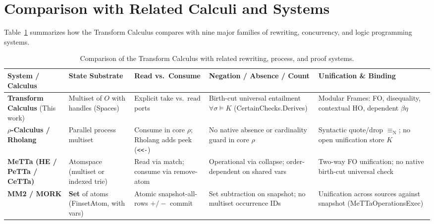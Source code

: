 \documentclass[11pt,a4paper]{article}
\theoremstyle{definition}
\DeclareRobustCommand{\lean}[1]{%
  \ifmmode\text{\normalfont\ttfamily\footnotesize\detokenize{#1}}%
  \else{\normalfont\footnotesize\leanurl{#1}}\fi}
\DeclareRobustCommand{\metta}[1]{\text{\normalfont\ttfamily\footnotesize #1}}
\def\lean#1{#1}%
\def\metta#1{#1}%
\begin{document}
\section{Comparison with Related Calculi and Systems}
\label{sec:related}

Table~\ref{tab:comparison} summarizes how the Transform Calculus compares with nine major families of rewriting, concurrency, and logic programming systems.

\begin{table}[t]
\centering
\caption{Comparison of the Transform Calculus with related rewriting, process, and proof systems.}
\label{tab:comparison}
\footnotesize
\setlength{\tabcolsep}{3.5pt}
\renewcommand{\arraystretch}{1.18}
\begin{tabular}{@{}>{\raggedright\arraybackslash}p{2.6cm}>{\raggedright\arraybackslash}p{2.3cm}>{\raggedright\arraybackslash}p{2.6cm}>{\raggedright\arraybackslash}p{3.6cm}>{\raggedright\arraybackslash}p{3.6cm}@{}}
\toprule
\textbf{System / Calculus} & \textbf{State Substrate} & \textbf{Read vs.\ Consume} & \textbf{Negation / Absence / Count} & \textbf{Unification \& Binding} \\
\midrule
\textbf{Transform Calculus} \newline (This work) & Multiset of $O$ with handles (\lean{Spaces}) & Explicit $\mathrm{take}$ vs.\ $\mathrm{read}$ ports & Birth-cut universal entailment $\forall \sigma \models K$ (\lean{CertainChecks.Derives}) & Modular \lean{Frames}: FO, disequality, contextual HO, dependent $\beta\eta$ \\
\textbf{$\rho$-Calculus / Rholang} \newline \cite{MeredithRadestock2005Rho} & Parallel process multiset & Consume in core $\rho$; Rholang adds \metta{peek} (\texttt{<<-}) & No native absence or cardinality guard in core $\rho$ & Syntactic quote/drop $\equiv_{\mathrm{N}}$; no open unification store $K$ \\
\textbf{MeTTa (HE / PeTTa / CeTTa)} \newline \cite{Goertzel2023MeTTa} & Atomspace (multiset or indexed trie) & Read via \metta{match}; consume via \metta{remove-atom} & Operational via \metta{collapse}; order-dependent on shared vars & Two-way FO unification; no native birth-cut universal check \\
\textbf{MM2 / MORK} \newline \cite{Goertzel2023MeTTa} & \textbf{Set} of atoms (\lean{Finset}\;\lean{Atom}, with vars) & Atomic snapshot-all-rows $+/-$ commit & Set subtraction on snapshot; no multiset occurrence IDs & Unification across sources against snapshot (\lean{MeTTaOperationsExec}) \\

\end{tabular}
\end{table}
\end{document}
